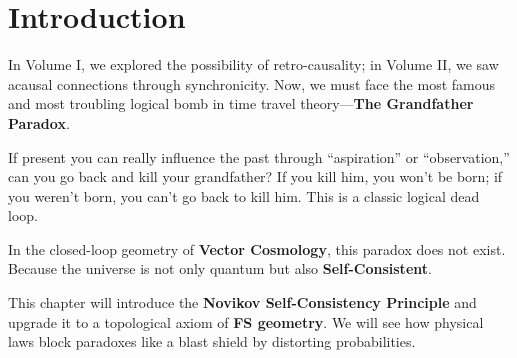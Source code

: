\section{Introduction}

In Volume I, we explored the possibility of retro-causality; in Volume II, we saw acausal connections through synchronicity. Now, we must face the most famous and most troubling logical bomb in time travel theory---\textbf{The Grandfather Paradox}.

If present you can really influence the past through ``aspiration'' or ``observation,'' can you go back and kill your grandfather? If you kill him, you won't be born; if you weren't born, you can't go back to kill him. This is a classic logical dead loop.

In the closed-loop geometry of \textbf{Vector Cosmology}, this paradox does not exist. Because the universe is not only quantum but also \textbf{Self-Consistent}.

This chapter will introduce the \textbf{Novikov Self-Consistency Principle} and upgrade it to a topological axiom of \textbf{FS geometry}. We will see how physical laws block paradoxes like a blast shield by distorting probabilities.

